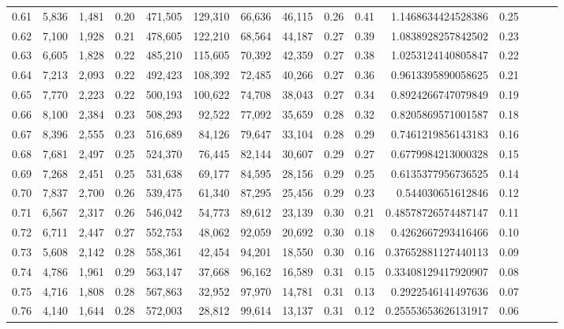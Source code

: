 \begin{tabular}{rrrrrrrrrrrrrrr}
0.61 &   5,836 &  1,481 &  0.20 &  471,505 &  129,310 &   66,636 &   46,115 &  0.26 &  0.41 &      1.1468634424528386 &      0.25 \\
0.62 &   7,100 &  1,928 &  0.21 &  478,605 &  122,210 &   68,564 &   44,187 &  0.27 &  0.39 &      1.0838928257842502 &      0.23 \\
0.63 &   6,605 &  1,828 &  0.22 &  485,210 &  115,605 &   70,392 &   42,359 &  0.27 &  0.38 &      1.0253124140805847 &      0.22 \\
0.64 &   7,213 &  2,093 &  0.22 &  492,423 &  108,392 &   72,485 &   40,266 &  0.27 &  0.36 &      0.9613395890058625 &      0.21 \\
0.65 &   7,770 &  2,223 &  0.22 &  500,193 &  100,622 &   74,708 &   38,043 &  0.27 &  0.34 &      0.8924266747079849 &      0.19 \\
0.66 &   8,100 &  2,384 &  0.23 &  508,293 &   92,522 &   77,092 &   35,659 &  0.28 &  0.32 &      0.8205869571001587 &      0.18 \\
0.67 &   8,396 &  2,555 &  0.23 &  516,689 &   84,126 &   79,647 &   33,104 &  0.28 &  0.29 &      0.7461219856143183 &      0.16 \\
0.68 &   7,681 &  2,497 &  0.25 &  524,370 &   76,445 &   82,144 &   30,607 &  0.29 &  0.27 &      0.6779984213000328 &      0.15 \\
0.69 &   7,268 &  2,451 &  0.25 &  531,638 &   69,177 &   84,595 &   28,156 &  0.29 &  0.25 &      0.6135377956736525 &      0.14 \\
0.70 &   7,837 &  2,700 &  0.26 &  539,475 &   61,340 &   87,295 &   25,456 &  0.29 &  0.23 &       0.544030651612846 &      0.12 \\
0.71 &   6,567 &  2,317 &  0.26 &  546,042 &   54,773 &   89,612 &   23,139 &  0.30 &  0.21 &     0.48578726574487147 &      0.11 \\
0.72 &   6,711 &  2,447 &  0.27 &  552,753 &   48,062 &   92,059 &   20,692 &  0.30 &  0.18 &      0.4262667293416466 &      0.10 \\
0.73 &   5,608 &  2,142 &  0.28 &  558,361 &   42,454 &   94,201 &   18,550 &  0.30 &  0.16 &     0.37652881127440113 &      0.09 \\
0.74 &   4,786 &  1,961 &  0.29 &  563,147 &   37,668 &   96,162 &   16,589 &  0.31 &  0.15 &     0.33408129417920907 &      0.08 \\
0.75 &   4,716 &  1,808 &  0.28 &  567,863 &   32,952 &   97,970 &   14,781 &  0.31 &  0.13 &      0.2922546141497636 &      0.07 \\
0.76 &   4,140 &  1,644 &  0.28 &  572,003 &   28,812 &   99,614 &   13,137 &  0.31 &  0.12 &     0.25553653626131917 &      0.06 \\

\end{tabular}
